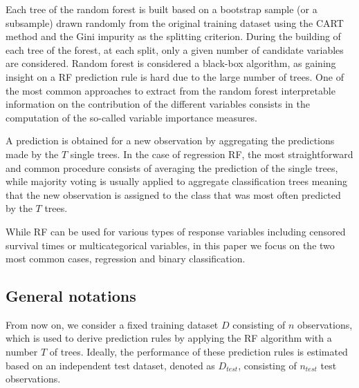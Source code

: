 \documentclass[paper=a4
               ,12pt
               ,DIV=12
               ,parskip=half
               ,titlepage=on
               ,headinclude 
               ,footinclude
               ,headsepline
               ,footsepline         %
               ,ilines 
               ]{scrartcl}
\begin{document}
Each tree of the random forest is built based on a bootstrap sample (or a subsample) drawn randomly from the original training dataset using the CART method and the Gini impurity 
\citep{Breiman1984} as the splitting criterion. During the building of each tree of the forest, at each split, only a given number of candidate variables are considered. 
Random forest is considered a black-box algorithm, as gaining insight on a RF prediction rule is hard due to the large number of trees. One of the most common approaches to extract from 
the random forest interpretable information on the contribution of the different variables consists in the computation of the so-called variable importance measures. 

A prediction is obtained for a new observation by aggregating the predictions made by the $T$ single trees. In the case of regression RF, the most straightforward and common procedure 
consists of averaging the prediction of the single trees, while majority voting is usually applied to aggregate classification trees meaning that the new observation is assigned to the 
class that was most often predicted by the $T$ trees. 






While RF can be used for various types of response variables including censored survival times or multicategorical variables, in this paper we focus on the two most common cases, regression and binary classification.

\subsection{General notations}
From now on, we consider a fixed training dataset $D$ consisting of $n$ observations, which is used to derive prediction rules by applying the RF algorithm with a number $T$ of trees.
Ideally, the performance of these prediction rules is estimated based on an independent test dataset, denoted as $D_{test}$, consisting of $n_{test}$ test observations.
\end{document}
